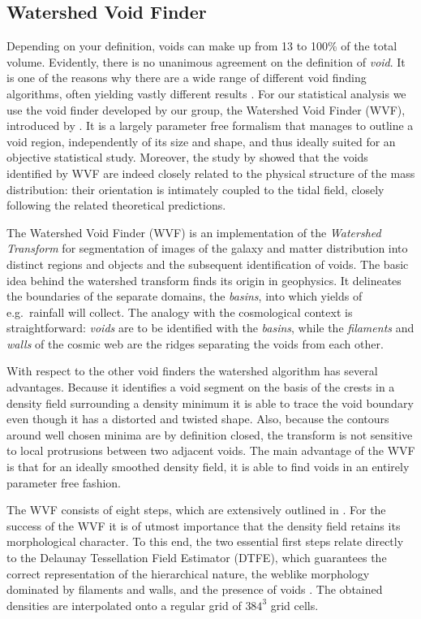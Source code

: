 \subsection{Watershed Void Finder}
\label{sec:structure_voids}
Depending on your definition, voids can make up from 13 to 100\% of the total volume. 
Evidently, there is no unanimous agreement on the definition of \emph{void}. It is one of the reasons 
why there are a wide range of different void finding algorithms, often yielding vastly different 
results \citep[see e.g.][]{colberg08}. For our statistical analysis we use the void finder developed 
by our group, the Watershed Void Finder (WVF), introduced by \cite{platen07}. It is a largely 
parameter free formalism that manages to outline a void region, independently of its size and 
shape, and thus ideally suited for an objective statistical study. Moreover, the study by 
\cite{platen08} showed that the voids identified by WVF are indeed closely related to the physical 
structure of the mass distribution: their orientation is intimately coupled to the 
tidal field, closely following the related theoretical predictions.

The Watershed Void Finder (WVF) is an implementation of the \emph{Watershed 
Transform} for segmentation of images of the galaxy and matter distribution 
into distinct regions and objects and the subsequent identification of voids. 
The basic idea behind the watershed transform finds its origin in geophysics. It 
delineates the boundaries of the separate domains, the \emph{basins}, into which 
yields of e.g.\ rainfall will collect. The analogy with the cosmological context is 
straightforward: \emph{voids} are to be identified with the {\it basins}, while 
the {\it filaments} and {\it walls} of the cosmic web are the ridges separating 
the voids from each other. 

With respect to the other void finders the watershed algorithm has several advantages. 
Because it identifies a void segment on the basis of the crests in a density field 
surrounding a density minimum it is able to trace the void boundary even though it 
has a distorted and twisted shape. Also, because the contours around well chosen minima 
are by definition closed, the transform is not sensitive to local protrusions between 
two adjacent voids. The main advantage of the WVF is that for an ideally smoothed density 
field, it is able to find voids in an entirely parameter free fashion.

The WVF consists of eight steps, which are extensively outlined in \cite{platen07}.  
For the success of the WVF it is of utmost importance that the density field retains 
its morphological character. To this end, the two essential first steps relate 
directly to the Delaunay Tessellation Field Estimator (DTFE), which guarantees the correct 
representation of the hierarchical nature, the weblike morphology dominated by filaments and 
walls, and the presence of voids \citep{schaap00,weygaert11,cautun11a}. The obtained densities 
are interpolated onto a regular grid of $384^3$ grid cells. 

